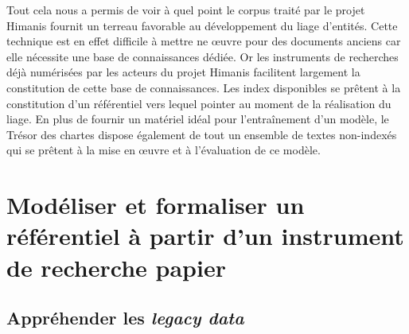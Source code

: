 \documentclass[a4paper,12pt,twoside]{book}
\makeatletter
\newcommand{\parttext}[1]{\def\@parttext{#1}}
\makeatother
\begin{document}
	Tout cela nous a permis de voir à quel point le corpus traité par le projet Himanis fournit un terreau favorable au développement du liage d'entités. Cette technique est en effet difficile à mettre ne œuvre pour des documents anciens car elle nécessite une base de connaissances dédiée. Or les instruments de recherches déjà numérisées par les acteurs du projet Himanis facilitent largement la constitution de cette base de connaissances. Les index disponibles se prêtent à la constitution d'un référentiel vers lequel pointer au moment de la réalisation du liage. En plus de fournir un matériel idéal pour l'entraînement d'un modèle, le Trésor des chartes dispose également de tout un ensemble de textes non-indexés qui se prêtent à la mise en œuvre et à l'évaluation de ce modèle.
	
	\parttext{L'objectif final du stage que nous avons réalisé étant de préparer l'apprentissage du liage d'entités à partir des données issues du projet Himanis, notre action s'est principalement concentrée sur la création d'un référentiel pouvant servir de base de connaissances. Nous consacrerons donc cette deuxième partie au travail de modélisation et de formalisation de ce référentiel à partir d'un index papier, activité qui a occupé la majeure partie de notre stage. Nous nous sommes concentrés ici sur l'index du premier volume de l'inventaire analytique des registres du Trésor des chartes portant sur les registres JJ 37 à JJ 50 et paru en 1958. Pour rendre compte de ce travail, nous décrirons dans un premier chapitre les différentes difficultés rencontrées pour comprendre et manipuler cet instrument de recherche. Puis nous dédierons un second chapitre à l'analyse des relations entre les entités. Nous consacrerons enfin un troisième chapitre à la transformation de l'index en une base de données relationnelle.}
	
	\part{Modéliser et formaliser un référentiel à partir d’un instrument de recherche papier}
	
	
	\chapter{Appréhender les \textit{legacy data}}
	
\end{document}

